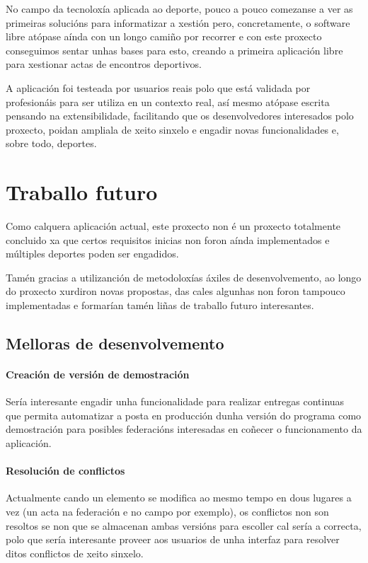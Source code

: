   No campo da tecnoloxía aplicada ao deporte, pouco a pouco comezanse a ver as 
primeiras solucións para informatizar a xestión pero, concretamente, o 
software libre atópase aínda con un longo camiño por recorrer e con este 
proxecto conseguimos sentar unhas bases para esto, creando a primeira 
aplicación libre para xestionar actas de encontros deportivos.

  A aplicación foi testeada por usuarios reais polo que está validada 
por profesionáis para ser utiliza en un contexto real, así mesmo atópase 
escrita pensando na extensibilidade, facilitando que os desenvolvedores 
interesados polo proxecto, poidan ampliala de xeito sinxelo e engadir novas 
funcionalidades e, sobre todo, deportes.


\section{Traballo futuro}
Como calquera aplicación actual, este proxecto non é un proxecto totalmente 
concluido xa que certos requisitos inicias non foron aínda implementados e 
múltiples deportes poden ser engadidos.

Tamén gracias a utilizanción de metodoloxías áxiles de desenvolvemento, ao 
longo do proxecto xurdiron novas propostas, das cales algunhas non foron 
tampouco implementadas e formarían tamén liñas de traballo futuro interesantes.

  \subsection{Melloras de desenvolvemento}

    \paragraph{Creación de versión de demostración} Sería interesante engadir 
unha funcionalidade para realizar entregas continuas que permita automatizar a 
posta en producción dunha versión do programa como demostración para posibles 
federacións interesadas en coñecer o funcionamento da aplicación.

    \paragraph{Resolución de conflictos} Actualmente cando un elemento se 
modifica ao mesmo tempo en dous lugares a vez (un acta na federación e no campo 
por exemplo), os conflictos non son resoltos se non que se almacenan ambas 
versións para escoller cal sería a correcta, polo que sería interesante proveer 
aos usuarios de unha interfaz para resolver ditos conflictos de xeito sinxelo.

